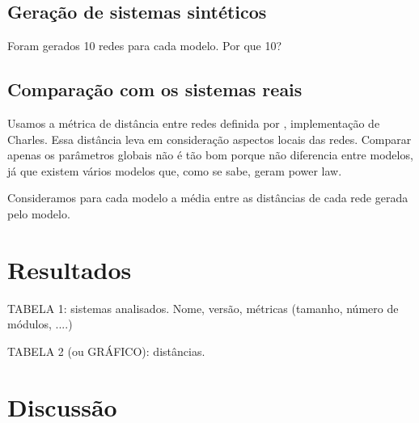 \documentclass{acm_proc_article-sp}
\begin{document}
\subsection{Geração de sistemas sintéticos}

Foram gerados 10 redes para cada modelo. Por que 10?

\subsection{Comparação com os sistemas reais}

Usamos a métrica de distância entre redes definida por \cite{Andrade2008}, implementação de Charles. Essa distância leva em consideração aspectos locais das redes. Comparar apenas os parâmetros globais não é tão bom porque não diferencia entre modelos, já que existem vários modelos que, como se sabe, geram power law.


Consideramos para cada modelo a média entre as distâncias de cada rede gerada pelo modelo.


\section{Resultados} %

TABELA 1: sistemas analisados. Nome, versão, métricas (tamanho, número de módulos, ....)

TABELA 2 (ou GRÁFICO): distâncias.


\section{Discussão} %
\end{document}
